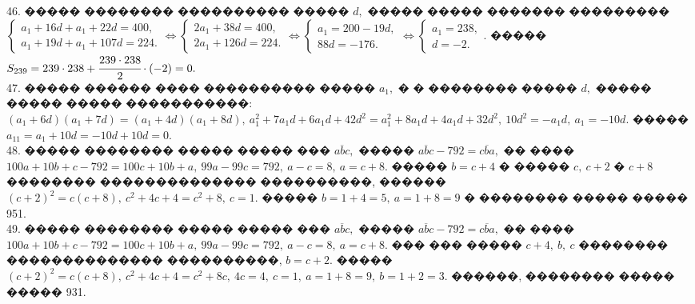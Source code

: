 \documentclass[12pt]{article}
\begin{document}
46. ����� �������� ���������� ����� $d,$ ����� ����� ������� ���������\\ $\begin{cases} a_1+16d+a_1+22d=400,\\a_1+19d+a_1+107d=224.\end{cases}\Leftrightarrow
\begin{cases} 2a_1+38d=400,\\2a_1+126d=224.\end{cases}\Leftrightarrow
\begin{cases} a_1=200-19d,\\88d=-176.\end{cases}\Leftrightarrow
\begin{cases} a_1=238,\\ d=-2.\end{cases}.$ ����� $S_{239}=239\cdot238+\cfrac{239\cdot238}{2}\cdot(-2)=0.$\\
47. ����� ������ ���� ���������� ����� $a_1,$ � � �������� ����� $d,$ ����� ����� ����� �����������:
$(a_1+6d)(a_1+7d)=(a_1+4d)(a_1+8d),\ a_1^2+7a_1d+6a_1d+42d^2=a_1^2+8a_1d+4a_1d+32d^2,\ 10d^2=-a_1d,\ a_1=-10d.$ ����� $a_{11}=a_1+10d=-10d+10d=0.$\\
48. ����� �������� ����� ����� ��� $\overline{abc},$ �����
$\overline{abc}-792=\overline{cba},$ �� ����
$100a+10b+c-792=100c+10b+a,\ 99a-99c=792,\ a-c=8,\ a=c+8.$ ����� $b=c+4$ � ����� $c,\ c+2$ � $c+8$ �������� �������������� ����������, ������ $(c+2)^2=c(c+8),\ c^2+4c+4=c^2+8,\ c=1.$ ����� $b=1+4=5,\ a=1+8=9$ � �������� ����� ����� 951.\\
49. ����� �������� ����� ����� ��� $\overline{abc},$ �����
$\overline{abc}-792=\overline{cba},$ �� ����
$100a+10b+c-792=100c+10b+a,\ 99a-99c=792,\ a-c=8,\ a=c+8.$ ��� ��� ����� $c+4,\ b,\ c$ �������� �������������� ����������, $b=c+2.$ ����� $(c+2)^2=c(c+8),\ c^2+4c+4=c^2+8c,\ 4c=4,\ c=1,\ a=1+8=9,\ b=1+2=3.$ ������, �������� ����� ����� 931.
\newpage
\end{document}
